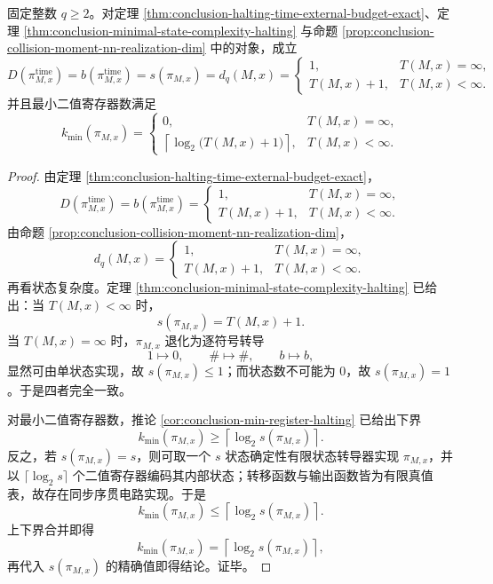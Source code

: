 \begin{theorem}\label{thm:conclusion-halting-fourfold-complexity-identity}
固定整数 \(q\ge 2\)。对定理 \ref{thm:conclusion-halting-time-external-budget-exact}、定理 \ref{thm:conclusion-minimal-state-complexity-halting} 与命题 \ref{prop:conclusion-collision-moment-nn-realization-dim} 中的对象，成立
\[
D\!\left(\pi^{\mathrm{time}}_{M,x}\right)
=
b\!\left(\pi^{\mathrm{time}}_{M,x}\right)
=
s(\pi_{M,x})
=
d_q(M,x)
=
\begin{cases}
1,& T(M,x)=\infty,\\[2pt]
T(M,x)+1,& T(M,x)<\infty.
\end{cases}
\]
并且最小二值寄存器数满足
\[
k_{\min}(\pi_{M,x})=
\begin{cases}
0,& T(M,x)=\infty,\\[2pt]
\left\lceil \log_2\!\bigl(T(M,x)+1\bigr)\right\rceil,& T(M,x)<\infty.
\end{cases}
\]
\end{theorem}
\begin{proof}
由定理 \ref{thm:conclusion-halting-time-external-budget-exact}，
\[
D\!\left(\pi^{\mathrm{time}}_{M,x}\right)
=
b\!\left(\pi^{\mathrm{time}}_{M,x}\right)
=
\begin{cases}
1,& T(M,x)=\infty,\\
T(M,x)+1,& T(M,x)<\infty.
\end{cases}
\]
由命题 \ref{prop:conclusion-collision-moment-nn-realization-dim}，
\[
d_q(M,x)=
\begin{cases}
1,& T(M,x)=\infty,\\
T(M,x)+1,& T(M,x)<\infty.
\end{cases}
\]
再看状态复杂度。定理 \ref{thm:conclusion-minimal-state-complexity-halting} 已给出：当 \(T(M,x)<\infty\) 时，
\[
s(\pi_{M,x})=T(M,x)+1.
\]
当 \(T(M,x)=\infty\) 时，\(\pi_{M,x}\) 退化为逐符号转导
\[
1\mapsto 0,\qquad \#\mapsto \#,\qquad b\mapsto b,
\]
显然可由单状态实现，故 \(s(\pi_{M,x})\le 1\)；而状态数不可能为 \(0\)，故 \(s(\pi_{M,x})=1\)。于是四者完全一致。

对最小二值寄存器数，推论 \ref{cor:conclusion-min-register-halting} 已给出下界
\[
k_{\min}(\pi_{M,x})\ge \left\lceil \log_2 s(\pi_{M,x})\right\rceil.
\]
反之，若 \(s(\pi_{M,x})=s\)，则可取一个 \(s\) 状态确定性有限状态转导器实现 \(\pi_{M,x}\)，并以 \(\lceil \log_2 s\rceil\) 个二值寄存器编码其内部状态；转移函数与输出函数皆为有限真值表，故存在同步序贯电路实现。于是
\[
k_{\min}(\pi_{M,x})\le \left\lceil \log_2 s(\pi_{M,x})\right\rceil.
\]
上下界合并即得
\[
k_{\min}(\pi_{M,x})=\left\lceil \log_2 s(\pi_{M,x})\right\rceil,
\]
再代入 \(s(\pi_{M,x})\) 的精确值即得结论。证毕。
\end{proof}

